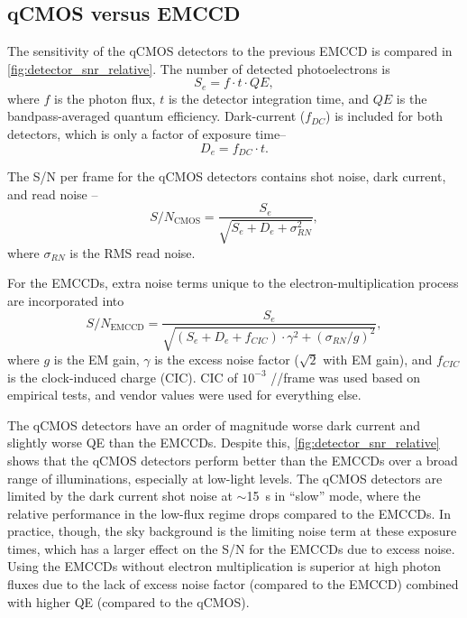 \subsection{qCMOS versus EMCCD}

The sensitivity of the qCMOS detectors to the previous EMCCD is compared in \autoref{fig:detector_snr_relative}. The number of detected photoelectrons is
\begin{equation}
    S_e = f \cdot t \cdot QE,
\end{equation}
where $f$ is the photon flux, $t$ is the detector integration time, and $QE$ is the bandpass-averaged quantum efficiency. Dark-current ($f_{DC}$) is included for both detectors, which is only a factor of exposure time--
\begin{equation}
    D_e = f_{DC} \cdot t.
\end{equation}

The S/N per frame for the qCMOS detectors contains shot noise, dark current, and read noise \citep{janesick_photon_2007,stefanov_cmos_2022}--
\begin{equation}
    S/N_\mathrm{CMOS} = \frac{S_e}{\sqrt{S_e + D_e + \sigma_{RN}^2}},
\end{equation}
where $\sigma_{RN}$ is the RMS read noise.

For the EMCCDs, extra noise terms unique to the electron-multiplication process \citep{harpsoe_bayesian_2012} are incorporated into
\begin{equation}
    S/N_\mathrm{EMCCD} = \frac{S_e}{\sqrt{\left(S_e + D_e + f_{CIC}\right) \cdot \gamma^2 + \left(\sigma_{RN}/g\right)^2}},
\end{equation}
where $g$ is the EM gain, $\gamma$ is the excess noise factor ($\sqrt{2}$ with EM gain), and $f_{CIC}$ is the clock-induced charge (CIC). CIC of $10^{-3}$ \si{\electron/\pixel/frame} was used based on empirical tests, and vendor values were used for everything else.

The qCMOS detectors have an order of magnitude worse dark current and slightly worse QE than the EMCCDs. Despite this, \autoref{fig:detector_snr_relative} shows that the qCMOS detectors perform better than the EMCCDs over a broad range of illuminations, especially at low-light levels. The qCMOS detectors are limited by the dark current shot noise at $\sim$\SI{15}{s} in ``slow'' mode, where the relative performance in the low-flux regime drops compared to the EMCCDs. In practice, though, the sky background is the limiting noise term at these exposure times, which has a larger effect on the S/N for the EMCCDs due to excess noise. Using the EMCCDs without electron multiplication is superior at high photon fluxes due to the lack of excess noise factor (compared to the EMCCD) combined with higher QE (compared to the qCMOS).

